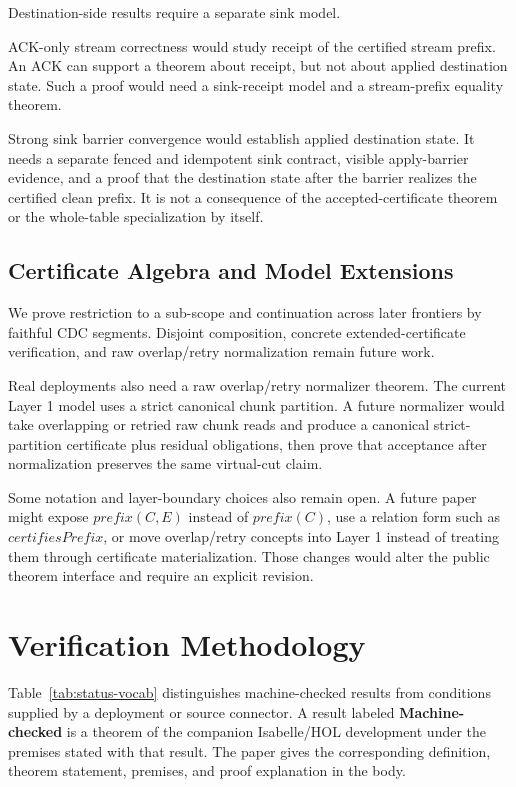 \documentclass[letterpaper,10pt,twocolumn]{article}
\newcommand{\CleanPrefix}{\mathit{prefix}}
\begin{document}
Destination-side results require a separate sink model.

ACK-only stream correctness would study receipt of the certified
stream prefix. An ACK can support a theorem about receipt, but not about
applied destination state. Such a proof would need a sink-receipt model
and a stream-prefix equality theorem.

Strong sink barrier convergence would establish applied destination
state. It needs a separate fenced and idempotent sink
contract, visible apply-barrier evidence, and a proof that the
destination state after the barrier realizes the certified clean
prefix. It is not a consequence of the accepted-certificate theorem
or the whole-table specialization by itself.

\subsection{Certificate Algebra and Model
Extensions}\label{certificate-algebra-and-model-extensions}

We prove restriction to a sub-scope and continuation across later
frontiers by faithful CDC segments. Disjoint composition, concrete
extended-certificate verification, and raw overlap/retry normalization
remain future work.

Real deployments also need a raw overlap/retry normalizer theorem. The
current Layer 1 model uses a strict canonical chunk partition. A future
normalizer would take overlapping or retried raw chunk reads and produce
a canonical strict-partition certificate plus residual obligations, then
prove that acceptance after normalization preserves the same virtual-cut
claim.

Some notation and layer-boundary choices also remain open. A
future paper might expose $\CleanPrefix(C,E)$ instead of
$\CleanPrefix(C)$, use a relation form such as
$\mathit{certifiesPrefix}$, or move overlap/retry concepts into Layer 1
instead of treating them through certificate materialization. Those
changes would alter the public theorem interface and require an explicit
revision.

\section{Verification Methodology}\label{verification-methodology}

Table~\ref{tab:status-vocab} distinguishes machine-checked results from
conditions supplied by a deployment or source connector. A result
labeled \textbf{Machine-checked} is a theorem of the companion
Isabelle/HOL development under the premises stated with that result.
The paper gives the corresponding definition, theorem statement,
premises, and proof explanation in the body.
\end{document}
